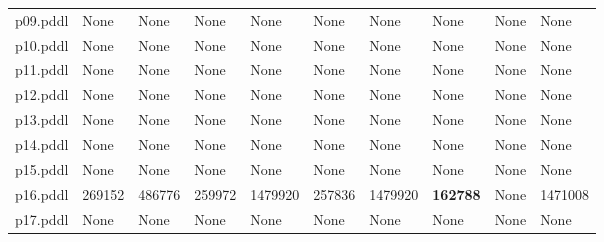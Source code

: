 \documentclass{article}
\begin{document}
\begin{tabular}{@{}lrrrrrrrrr@{}}
p09.pddl & \multicolumn{1}{|l|}{None} & \multicolumn{1}{|l|}{None} & \multicolumn{1}{|l|}{None} & \multicolumn{1}{|l|}{None} & \multicolumn{1}{|l|}{None} & \multicolumn{1}{|l|}{None} & \multicolumn{1}{|l|}{None} & \multicolumn{1}{|l|}{None} & \multicolumn{1}{|l|}{None} \\
p10.pddl & \multicolumn{1}{|l|}{None} & \multicolumn{1}{|l|}{None} & \multicolumn{1}{|l|}{None} & \multicolumn{1}{|l|}{None} & \multicolumn{1}{|l|}{None} & \multicolumn{1}{|l|}{None} & \multicolumn{1}{|l|}{None} & \multicolumn{1}{|l|}{None} & \multicolumn{1}{|l|}{None} \\
p11.pddl & \multicolumn{1}{|l|}{None} & \multicolumn{1}{|l|}{None} & \multicolumn{1}{|l|}{None} & \multicolumn{1}{|l|}{None} & \multicolumn{1}{|l|}{None} & \multicolumn{1}{|l|}{None} & \multicolumn{1}{|l|}{None} & \multicolumn{1}{|l|}{None} & \multicolumn{1}{|l|}{None} \\
p12.pddl & \multicolumn{1}{|l|}{None} & \multicolumn{1}{|l|}{None} & \multicolumn{1}{|l|}{None} & \multicolumn{1}{|l|}{None} & \multicolumn{1}{|l|}{None} & \multicolumn{1}{|l|}{None} & \multicolumn{1}{|l|}{None} & \multicolumn{1}{|l|}{None} & \multicolumn{1}{|l|}{None} \\
p13.pddl & \multicolumn{1}{|l|}{None} & \multicolumn{1}{|l|}{None} & \multicolumn{1}{|l|}{None} & \multicolumn{1}{|l|}{None} & \multicolumn{1}{|l|}{None} & \multicolumn{1}{|l|}{None} & \multicolumn{1}{|l|}{None} & \multicolumn{1}{|l|}{None} & \multicolumn{1}{|l|}{None} \\
p14.pddl & \multicolumn{1}{|l|}{None} & \multicolumn{1}{|l|}{None} & \multicolumn{1}{|l|}{None} & \multicolumn{1}{|l|}{None} & \multicolumn{1}{|l|}{None} & \multicolumn{1}{|l|}{None} & \multicolumn{1}{|l|}{None} & \multicolumn{1}{|l|}{None} & \multicolumn{1}{|l|}{None} \\
p15.pddl & \multicolumn{1}{|l|}{None} & \multicolumn{1}{|l|}{None} & \multicolumn{1}{|l|}{None} & \multicolumn{1}{|l|}{None} & \multicolumn{1}{|l|}{None} & \multicolumn{1}{|l|}{None} & \multicolumn{1}{|l|}{None} & \multicolumn{1}{|l|}{None} & \multicolumn{1}{|l|}{None} \\
p16.pddl & 269152 & 486776 & 259972 & 1479920 & 257836 & 1479920 & \textbf{162788} & \multicolumn{1}{|l|}{None} & 1471008 \\
p17.pddl & \multicolumn{1}{|l|}{None} & \multicolumn{1}{|l|}{None} & \multicolumn{1}{|l|}{None} & \multicolumn{1}{|l|}{None} & \multicolumn{1}{|l|}{None} & \multicolumn{1}{|l|}{None} & \multicolumn{1}{|l|}{None} & \multicolumn{1}{|l|}{None} & \multicolumn{1}{|l|}{None} \\

\end{tabular}
\end{document}
